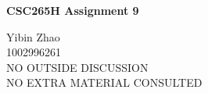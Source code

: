\documentclass[10pt]{article}
\begin{document}
\begin{center}
{\bf \Large \bf CSC265H Assignment 9}
\end{center}

\noindent
Yibin Zhao\\
1002996261\\
NO OUTSIDE DISCUSSION\\
NO EXTRA MATERIAL CONSULTED\\

\begin{comment}
	A list of the vertices of a graph is the order they are visited during a
	breadth first search is called a breadth first search order of the graph.
	Similarly, a depth first search order of a graph is a list of the vertices
	of a graph in the order they are visited during a depth first search. 
	Note that the breadth first search order and depth first search order of a
	graph can depend on the order in which the children oeach node are
	enumerated.

	For any (directed or undirected) graph $G=(V,E)$, its squeare $G^2=(V,E^2)$
	is the graph with the same vertex set $V$ and with edge set consisting of
	all pairs of vertices that are distance one or two apart in $G$. 
	In other $G^2$ can be obtained from $G$ by adding new edges joining all
	pairs of vertices that are distance two apart in $G$.
\end{comment}
\end{document}

